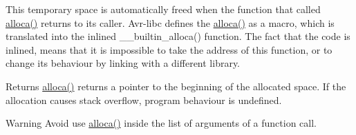 This temporary space is automatically freed when the function that called \hyperlink{group__alloca_gabdd78c9d072e9d390bed0e8b79087a85}{alloca()} returns to its caller. Avr-\/libc defines the \hyperlink{group__alloca_gabdd78c9d072e9d390bed0e8b79087a85}{alloca()} as a macro, which is translated into the inlined {\ttfamily \+\_\+\+\_\+builtin\+\_\+alloca()} function. The fact that the code is inlined, means that it is impossible to take the address of this function, or to change its behaviour by linking with a different library.

\begin{DoxyReturn}{Returns}
\hyperlink{group__alloca_gabdd78c9d072e9d390bed0e8b79087a85}{alloca()} returns a pointer to the beginning of the allocated space. If the allocation causes stack overflow, program behaviour is undefined.
\end{DoxyReturn}
\begin{DoxyWarning}{Warning}
Avoid use \hyperlink{group__alloca_gabdd78c9d072e9d390bed0e8b79087a85}{alloca()} inside the list of arguments of a function call. 
\end{DoxyWarning}
